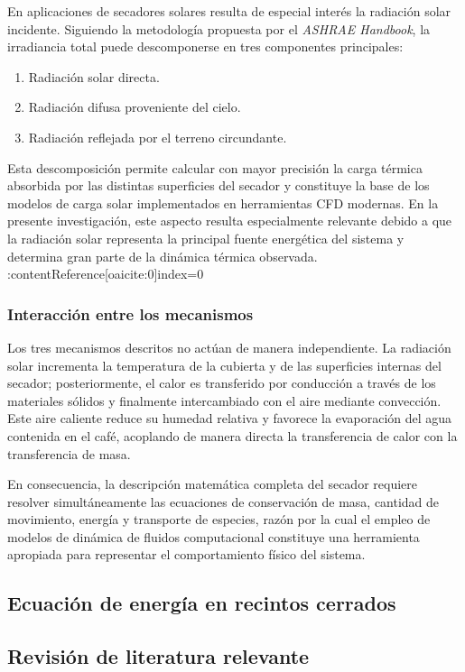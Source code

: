 En aplicaciones de secadores solares resulta de especial interés la radiación solar incidente. Siguiendo la metodología propuesta por el \textit{ASHRAE Handbook}, la irradiancia total puede descomponerse en tres componentes principales:

\begin{enumerate}
\item Radiación solar directa.
\item Radiación difusa proveniente del cielo.
\item Radiación reflejada por el terreno circundante.
\end{enumerate}

Esta descomposición permite calcular con mayor precisión la carga térmica absorbida por las distintas superficies del secador y constituye la base de los modelos de carga solar implementados en herramientas CFD modernas. En la presente investigación, este aspecto resulta especialmente relevante debido a que la radiación solar representa la principal fuente energética del sistema y determina gran parte de la dinámica térmica observada. :contentReference[oaicite:0]{index=0}

\subsubsection{Interacción entre los mecanismos}

Los tres mecanismos descritos no actúan de manera independiente. La radiación solar incrementa la temperatura de la cubierta y de las superficies internas del secador; posteriormente, el calor es transferido por conducción a través de los materiales sólidos y finalmente intercambiado con el aire mediante convección. Este aire caliente reduce su humedad relativa y favorece la evaporación del agua contenida en el café, acoplando de manera directa la transferencia de calor con la transferencia de masa.

En consecuencia, la descripción matemática completa del secador requiere resolver simultáneamente las ecuaciones de conservación de masa, cantidad de movimiento, energía y transporte de especies, razón por la cual el empleo de modelos de dinámica de fluidos computacional constituye una herramienta apropiada para representar el comportamiento físico del sistema.
\subsection{Ecuación de energía en recintos cerrados}
\subsection{Revisión de literatura relevante}


